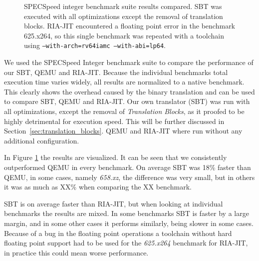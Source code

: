 \documentclass[course=eragp]{aspdoc}
\begin{document}
\begin{figure}
\begin{centering}
        \caption{
            SPECSpeed integer benchmark suite results compared.
            SBT was executed with all optimizations except the removal of translation blocks.
            RIA-JIT encountered a floating point error in the benchmark 625.x264, so this
            single benchmark was repeated with a toolchain using \texttt{--with-arch=rv64iamc --with-abi=lp64}.
        }\label{benchmark_results1}
    \end{centering}
\end{figure}


We used the SPECSpeed Integer benchmark suite to compare
the performance of our SBT, QEMU and RIA-JIT. Because the individual benchmarks
total execution time varies widely, all results are normalized to a native
benchmark. This clearly shows the overhead caused by the binary translation
and can be used to compare SBT, QEMU and RIA-JIT.
Our own translator (SBT) was run with all optimizations, except the removal of
\emph{Translation Blocks}, as it proofed to be highly detrimental for execution speed.
This will be further discussed in Section~\ref{sec:translation_blocks}. %
QEMU and RIA-JIT where run without any additional configuration.

\par

In Figure \ref{benchmark_results1} the results are visualized.
It can be seen that we consistently outperformed QEMU in every benchmark.
On average SBT was 18\% faster than QEMU, in some cases, namely \emph{658.xz}, the difference was
very small, but in others it was as much as XX\% when comparing the XX benchmark.

\par

SBT is on average faster than RIA-JIT, but when looking at individual benchmarks the results are mixed.
In some benchmarks SBT is faster by a large margin, and in some other cases it performs similarly, being slower in some cases.
Because of a bug in the floating point operations a toolchain without hard floating point support had to be used for the \emph{625.x264} benchmark for RIA-JIT,
in practice this could mean worse performance.
\end{document}
